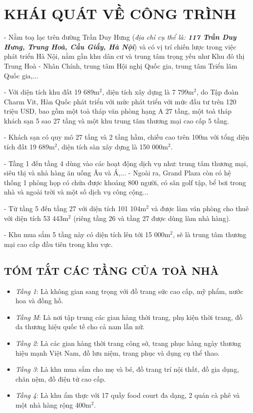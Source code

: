 
	\section{KHÁI QUÁT VỀ CÔNG TRÌNH}
- Nằm toạ lạc trên đường Trần Duy Hưng (\emph{địa chỉ cụ thể là: \textbf{117 Trần Duy Hưng, Trung Hoà, Cầu Giấy, Hà Nội}}) và có vị trí chiến lược trong việc phát triển Hà Nội, nằm gần khu dân cư và trung tâm trọng yếu như Khu đô thị Trung Hoà - Nhân Chính, trung tâm Hội nghị Quốc gia, trung tâm Triển lãm Quốc gia,...
	
	- Với diện tích khu đất 19 689m$^{2}$, diện tích xây dựng là 7 799m$^{2}$, do Tập đoàn Charm Vit, Hàn Quốc phát triển với mức phát triển với mức đầu tư trên 120 triệu USD, bao gồm một toà tháp văn phòng hạng A 27 tầng, một toà tháp khách sạn 5 sao 27 tầng và một khu trung tâm thương mại cao cấp 5 tầng.
	
	- Khách sạn có quy mô 27 tầng và 2 tầng hầm, chiều cao trên 100m với tổng diện tích đất 19 689m$^{2}$, diện tích sàn xây dựng là 150 000m$^{2}$.
	
	- Tầng 1 đến tầng 4 dùng vào các hoạt động dịch vụ như: trung tâm thương mại, siêu thị và nhà hàng ăn uống Âu và Á,...
	- Ngoài ra, Grand Plaza còn có hệ thống 1 phòng họp có chứa được khoảng 800 người, có sân golf tập, bể bơi trong nhà và ngoài trời và một số dịch vụ công cộng...
	
	- Từ tầng 5 đến tầng 27 với diện tích 101 104m$^{2}$ và được làm văn phòng cho thuê với diện tích 53 443m$^{2}$ (riêng tầng 26 và tầng 27 được dùng làm nhà hàng).	
	
	- Khu mua sắm 5 tầng này có diện tích lên tới 15 000m$^{2}$, sẽ là trung tâm thương mại cao cấp đầu tiên trong khu vực.
	
	\subsection{TÓM TẮT CÁC TẦNG CỦA TOÀ NHÀ}
	\begin{itemize}
	\setlength\itemsep{1mm}
		\item \emph{Tầng 1}: Là không gian sang trọng với đồ trang sức cao cấp, mỹ phẩm, nước hoa và đồng hồ.
	
		\item \emph{Tầng M}: Là nơi tập trung các gian hàng thời trang, phụ kiện thời trang, đồ da thương hiệu quốc tế cho cả nam lẫn nữ.
	
		\item \emph{Tầng 2}: Là các gian hàng thời trang công sở, trang phục hàng ngày thương hiệu mạnh Việt Nam, đồ lưu niệm, trang phục và dụng cụ thể thao.
	
		\item \emph{Tầng 3}: Là khu mua sắm cho mẹ và bé, đồ trang trí nội thất, đồ gia dụng, chăn nệm, đồ điện tử cao cấp.
	
		\item \emph{Tầng 4}: Là khu ẩm thực với 17 quầy food court đa dạng, 2 quán cà phê và một nhà hàng rộng 400m$^{2}$.
	\end{itemize}
	
